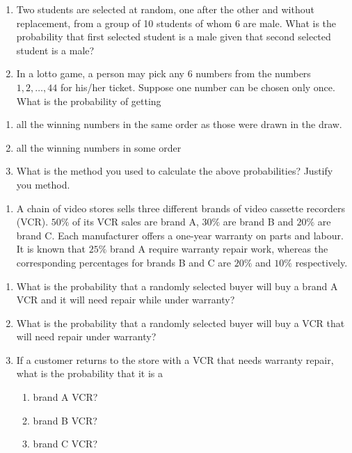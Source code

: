 \documentclass[]{book}
\providecommand{\tightlist}{%
  \setlength{\itemsep}{0pt}\setlength{\parskip}{0pt}}
\begin{document}
\begin{enumerate}
\def\labelenumi{\arabic{enumi}.}
\setcounter{enumi}{17}
\item
  Two students are selected at random, one after the other and without replacement, from a group of 10 students of whom 6 are male. What is the probability that ﬁrst selected student is a male given that second selected student is a male?
\item
  In a lotto game, a person may pick any 6 numbers from the numbers \(1, 2, \dots, 44\) for his/her ticket. Suppose one number can be chosen only once. What is the probability of getting
\end{enumerate}

\begin{enumerate}
\def\labelenumi{(\alph{enumi})}
\tightlist
\item
  all the winning numbers in the same order as those were drawn in the draw.
\item
  all the winning numbers in some order
\item
  What is the method you used to calculate the above probabilities? Justify you method.
\end{enumerate}

\begin{enumerate}
\def\labelenumi{\arabic{enumi}.}
\setcounter{enumi}{19}
\tightlist
\item
  A chain of video stores sells three diﬀerent brands of video cassette recorders (VCR). \(50\%\) of its VCR sales are brand A, \(30\%\) are brand B and \(20\%\) are brand C. Each manufacturer oﬀers a one-year warranty on parts and labour. It is known that \(25\%\) brand A require warranty repair work, whereas the corresponding percentages for brands B and C are \(20\%\) and \(10\%\) respectively.
\end{enumerate}

\begin{enumerate}
\def\labelenumi{(\alph{enumi})}
\item
  What is the probability that a randomly selected buyer will buy a brand A VCR and it will need repair while under warranty?
\item
  What is the probability that a randomly selected buyer will buy a VCR that will need repair under warranty?
\item
  If a customer returns to the store with a VCR that needs warranty repair, what is the probability that it is a

  \begin{enumerate}
  \def\labelenumii{(\roman{enumii})}
  \tightlist
  \item
    brand A VCR?
  \item
    brand B VCR?
  \item
    brand C VCR?
  \end{enumerate}
\end{enumerate}
\end{document}
